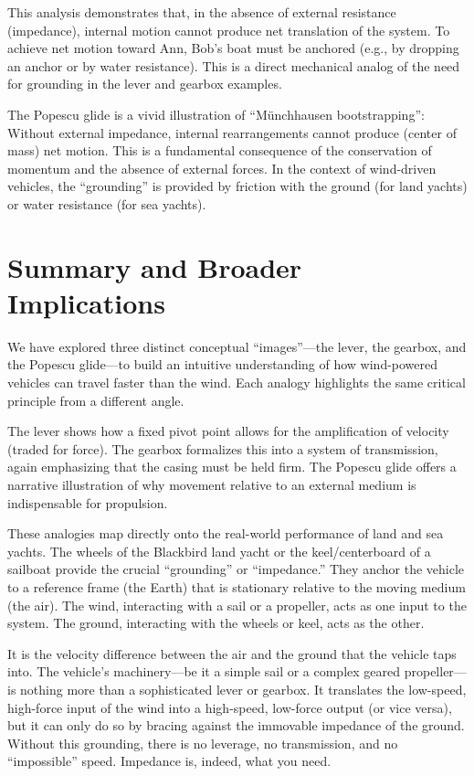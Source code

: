 \documentclass[reprint,aps,pra,superscriptaddress,longbibliography]{revtex4-2}
\begin{document}
This analysis demonstrates that, in the absence of external resistance (impedance), internal motion cannot produce net translation of the system. To achieve net motion toward Ann, Bob's boat must be anchored (e.g., by dropping an anchor or by water resistance). This is a direct mechanical analog of the need for grounding in the lever and gearbox examples.

The Popescu glide is a vivid illustration of ``M\"unchhausen bootstrapping'': Without external impedance, internal rearrangements cannot produce (center of mass) net motion. This is a fundamental consequence of the conservation of momentum and the absence of external forces. In the context of wind-driven vehicles, the ``grounding'' is provided by friction with the ground (for land yachts) or water resistance (for sea yachts).

\section{Summary and Broader Implications}

We have explored three distinct conceptual ``images''---the lever, the gearbox, and the Popescu glide---to build an intuitive understanding of how wind-powered vehicles can travel faster than the wind. Each analogy highlights the same critical principle from a different angle.

The lever shows how a fixed pivot point allows for the amplification of velocity (traded for force). The gearbox formalizes this into a system of transmission, again emphasizing that the casing must be held firm. The Popescu glide offers a narrative illustration of why movement relative to an external medium is indispensable for propulsion.

These analogies map directly onto the real-world performance of land and sea yachts. The wheels of the Blackbird land yacht or the keel/centerboard of a sailboat provide the crucial ``grounding'' or ``impedance.'' They anchor the vehicle to a reference frame (the Earth) that is stationary relative to the moving medium (the air). The wind, interacting with a sail or a propeller, acts as one input to the system. The ground, interacting with the wheels or keel, acts as the other.

It is the velocity difference between the air and the ground that the vehicle taps into. The vehicle's machinery---be it a simple sail or a complex geared propeller---is nothing more than a sophisticated lever or gearbox. It translates the low-speed, high-force input of the wind into a high-speed, low-force output (or vice versa), but it can only do so by bracing against the immovable impedance of the ground. Without this grounding, there is no leverage, no transmission, and no ``impossible'' speed. Impedance is, indeed, what you need.
\end{document}
